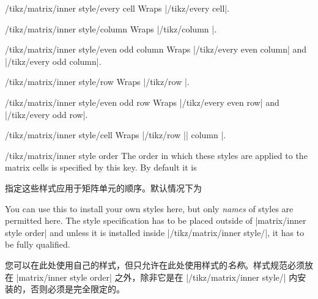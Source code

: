 \begin{stylekey}{/tikz/matrix/inner style/every cell}
    Wraps |/tikz/every cell|.
\end{stylekey}
\begin{stylekey}{/tikz/matrix/inner style/column}
    Wraps |/tikz/column |.
\end{stylekey}
\begin{stylekey}{/tikz/matrix/inner style/even odd column}
    Wraps |/tikz/every even column| and |/tikz/every odd column|.
\end{stylekey}
\begin{stylekey}{/tikz/matrix/inner style/row}
    Wraps |/tikz/row |.
\end{stylekey}
\begin{stylekey}{/tikz/matrix/inner style/even odd row}
    Wraps |/tikz/every even row| and |/tikz/every odd row|.
\end{stylekey}
\begin{stylekey}{/tikz/matrix/inner style/cell}
    Wraps |/tikz/row || column |.
\end{stylekey}

\begin{stylekey}{/tikz/matrix/inner style order}
    The order in which these styles are applied to the matrix cells is
    specified by this key.  By default it is
    
    指定这些样式应用于矩阵单元的顺序。默认情况下为


\begin{codeexample}
\end{codeexample}
    You can use this to install your own styles here, but only \emph{names} of
    styles are permitted here.  The style specification has to be placed
    outside of |matrix/inner style order| and unless it is installed inside
    |/tikz/matrix/inner style/|, it has to be fully qualified.
    
    您可以在此处使用自己的样式，但只允许在此处使用样式的\emph{名称}。样式规范必须放在 |matrix/inner style order| 之外，除非它是在 |/tikz/matrix/inner style/| 内安装的，否则必须是完全限定的。

    
\begin{codeexample}
\end{codeexample}
\end{stylekey}

